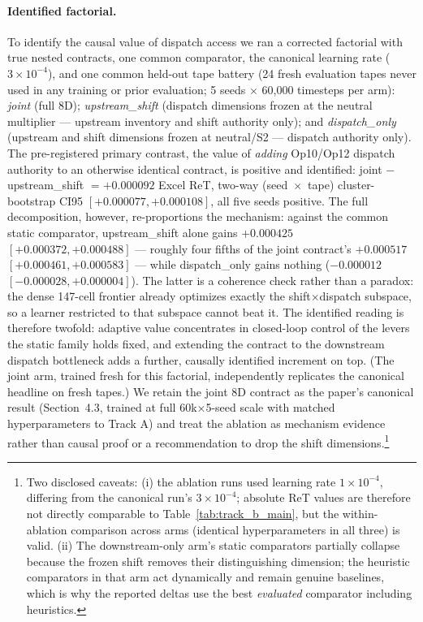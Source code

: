 \paragraph{Identified factorial.} To identify the causal value of dispatch
access we ran a corrected factorial with true nested contracts, one common
comparator, the canonical learning rate ($3\times10^{-4}$), and one common
held-out tape battery (24 fresh evaluation tapes never used in any training
or prior evaluation; 5 seeds $\times$ 60{,}000 timesteps per arm):
\emph{joint} (full 8D); \emph{upstream\_shift} (dispatch dimensions frozen
at the neutral multiplier --- upstream inventory and shift authority only);
and \emph{dispatch\_only} (upstream and shift dimensions frozen at neutral/S2
--- dispatch authority only). The pre-registered primary contrast, the value
of \emph{adding} Op10/Op12 dispatch authority to an otherwise identical
contract, is positive and identified: joint $-$ upstream\_shift
$= +0.000092$ Excel ReT, two-way (seed~$\times$~tape) cluster-bootstrap CI95
$[+0.000077, +0.000108]$, all five seeds positive. The full decomposition,
however, re-proportions the mechanism: against the common static comparator,
upstream\_shift alone gains $+0.000425$ $[+0.000372, +0.000488]$ ---
roughly four fifths of the joint contract's $+0.000517$
$[+0.000461, +0.000583]$ --- while dispatch\_only gains nothing
($-0.000012$ $[-0.000028, +0.000004]$). The latter is a coherence check
rather than a paradox: the dense 147-cell frontier already optimizes
exactly the shift$\times$dispatch subspace, so a learner restricted to that
subspace cannot beat it. The identified reading is therefore twofold:
adaptive value concentrates in closed-loop control of the levers the static
family holds fixed, and extending the contract to the downstream dispatch
bottleneck adds a further, causally identified increment on top. (The joint
arm, trained fresh for this factorial, independently replicates the
canonical headline on fresh tapes.) We retain the
joint 8D contract as the paper's canonical result (Section~4.3, trained at
full 60k$\times$5-seed scale with matched hyperparameters to Track A) and
treat the ablation as mechanism evidence rather than causal proof or a
recommendation to
drop the shift dimensions.\footnote{Two disclosed caveats: (i) the
ablation runs used learning rate
$1\times10^{-4}$, differing from the canonical run's $3\times10^{-4}$;
absolute ReT values are therefore not directly comparable to
Table~\ref{tab:track_b_main}, but the within-ablation comparison across
arms (identical hyperparameters in all three) is valid. (ii) The
downstream-only arm's static comparators partially collapse because the
frozen shift removes their distinguishing dimension; the heuristic
comparators in that arm act dynamically and remain genuine baselines,
which is why the reported deltas use the best \emph{evaluated} comparator
including heuristics.}

